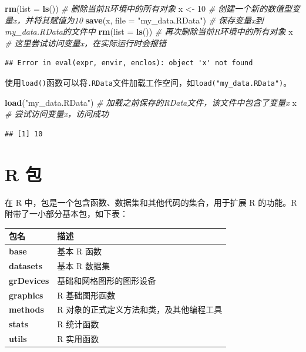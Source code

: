 \documentclass[
]{book}
\newenvironment{Shaded}{\begin{snugshade}}{\end{snugshade}}
\newcommand{\AttributeTok}[1]{\textcolor[rgb]{0.13,0.29,0.53}{#1}}
\newcommand{\CommentTok}[1]{\textcolor[rgb]{0.56,0.35,0.01}{\textit{#1}}}
\newcommand{\DecValTok}[1]{\textcolor[rgb]{0.00,0.00,0.81}{#1}}
\newcommand{\FunctionTok}[1]{\textcolor[rgb]{0.13,0.29,0.53}{\textbf{#1}}}
\newcommand{\NormalTok}[1]{#1}
\newcommand{\OtherTok}[1]{\textcolor[rgb]{0.56,0.35,0.01}{#1}}
\newcommand{\StringTok}[1]{\textcolor[rgb]{0.31,0.60,0.02}{#1}}
\begin{document}
\begin{Shaded}
\begin{Highlighting}[]
\FunctionTok{rm}\NormalTok{(}\AttributeTok{list =} \FunctionTok{ls}\NormalTok{())                 }\CommentTok{\# 删除当前R环境中的所有对象}
\NormalTok{x }\OtherTok{\textless{}{-}} \DecValTok{10}                         \CommentTok{\# 创建一个新的数值型变量x，并将其赋值为10}
\FunctionTok{save}\NormalTok{(x, }\AttributeTok{file =} \StringTok{"my\_data.RData"}\NormalTok{) }\CommentTok{\# 保存变量x到my\_data.RData的文件中}
\FunctionTok{rm}\NormalTok{(}\AttributeTok{list =} \FunctionTok{ls}\NormalTok{())                 }\CommentTok{\# 再次删除当前R环境中的所有对象}
\NormalTok{x                               }\CommentTok{\# 这里尝试访问变量x，在实际运行时会报错}
\end{Highlighting}
\end{Shaded}

\begin{verbatim}
## Error in eval(expr, envir, enclos): object 'x' not found
\end{verbatim}

使用\texttt{load()}函数可以将\texttt{.RData}文件加载工作空间，如\texttt{load("my\_data.RData")}。

\begin{Shaded}
\begin{Highlighting}[]
\FunctionTok{load}\NormalTok{(}\StringTok{"my\_data.RData"}\NormalTok{) }\CommentTok{\# 加载之前保存的RData文件，该文件中包含了变量x }
\NormalTok{x                     }\CommentTok{\# 尝试访问变量x，访问成功}
\end{Highlighting}
\end{Shaded}

\begin{verbatim}
## [1] 10
\end{verbatim}

\section{R 包}\label{r-ux5305}

在 R 中，包是一个包含函数、数据集和其他代码的集合，用于扩展 R 的功能。R 附带了一小部分基本包，如下表：

\begin{longtable}[]{@{}ll@{}}
\toprule\noalign{}
包名 & 描述 \\
\midrule\noalign{}
\endhead
\bottomrule\noalign{}
\endlastfoot
\textbf{base} & 基本 R 函数 \\
\textbf{datasets} & 基本 R 数据集 \\
\textbf{grDevices} & 基础和网格图形的图形设备 \\
\textbf{graphics} & R 基础图形函数 \\
\textbf{methods} & R 对象的正式定义方法和类，及其他编程工具 \\
\textbf{stats} & R 统计函数 \\
\textbf{utils} & R 实用函数 \\
\end{longtable}
\end{document}
